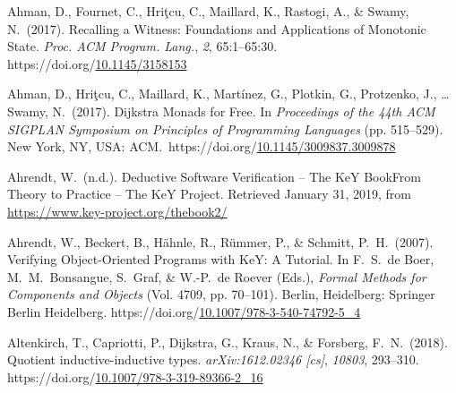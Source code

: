 \documentclass[12pt,twoside]{article}
\begin{document}
{\begin{thebibliography}{222}
Ahman, D., Fournet, C., Hriţcu, C., Maillard, K., Rastogi, A., \& Swamy, N.~(2017). Recalling a Witness: Foundations and Applications of Monotonic State. \emph{Proc. ACM Program. Lang.}, \emph{2}, 65:1–65:30. https://doi.org/\href{https://dx.doi.org/10.1145/3158153}{10.1145/3158153}\label{ahman_recalling_2017}%

Ahman, D., Hriţcu, C., Maillard, K., Martínez, G., Plotkin, G., Protzenko, J., … Swamy, N.~(2017). Dijkstra Monads for Free. In \emph{Proceedings of the 44th ACM SIGPLAN Symposium on Principles of Programming Languages} (pp. 515–529). New York, NY, USA: ACM.~https://doi.org/\href{https://dx.doi.org/10.1145/3009837.3009878}{10.1145/3009837.3009878}\label{ahman_dijkstra_2017}%

\mdbibitemlabel{[Ahrendt, n.d.]}Ahrendt, W.~(n.d.). Deductive Software Verification – The KeY BookFrom Theory to Practice – The KeY Project. Retrieved January 31, 2019, from \href{https://www.key-project.org/thebook2/}{{\ttfamily https://\hspace{0pt}www.\hspace{0pt}key-\hspace{0pt}project.\hspace{0pt}org/\hspace{0pt}thebook2/\hspace{0pt}}}\label{ahrendt_deductive_nodate}%

Ahrendt, W., Beckert, B., Hähnle, R., Rümmer, P., \& Schmitt, P.~H.~(2007). Verifying Object-Oriented Programs with KeY: A Tutorial. In F.~S.~de Boer, M.~M.~Bonsangue, S.~Graf, \& W.-P.~de Roever (Eds.), \emph{Formal Methods for Components and Objects} (Vol. 4709, pp. 70–101). Berlin, Heidelberg: Springer Berlin Heidelberg. https://doi.org/\href{https://dx.doi.org/10.1007/978-3-540-74792-5_4}{10.1007/978-3-540-74792-5\_4}\label{hutchison_verifying_2007}%

Altenkirch, T., Capriotti, P., Dijkstra, G., Kraus, N., \& Forsberg, F.~N.~(2018). Quotient inductive-inductive types. \emph{arXiv:1612.02346 {}[cs]}, \emph{10803}, 293–310. https://doi.org/\href{https://dx.doi.org/10.1007/978-3-319-89366-2_16}{10.1007/978-3-319-89366-2\_16}\label{altenkirch_quotient_2018}%


\end{thebibliography}}
\end{document}
